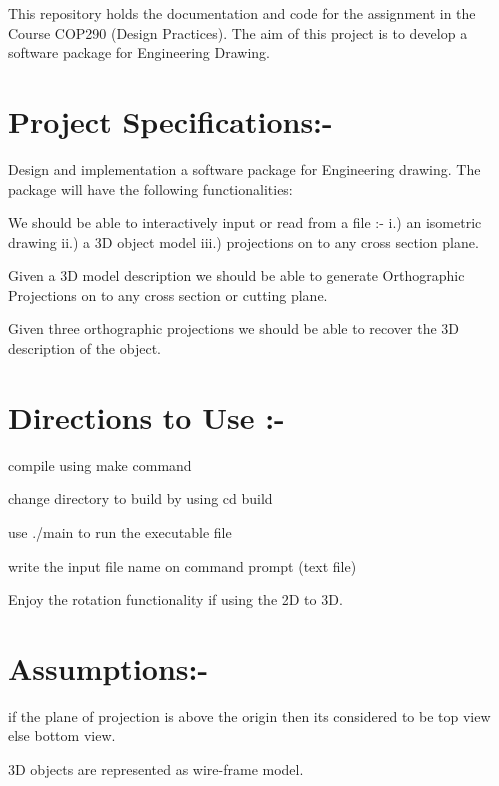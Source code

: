 This repository holds the documentation and code for the assignment in the Course C\+O\+P290 (Design Practices). The aim of this project is to develop a software package for Engineering Drawing.

\section*{Project Specifications\+:-\/}

Design and implementation a software package for Engineering drawing. The package will have the following functionalities\+:
\begin{DoxyEnumerate}
\item We should be able to interactively input or read from a file \+:-\/ i.) an isometric drawing ii.) a 3D object model iii.) projections on to any cross section plane.
\item Given a 3D model description we should be able to generate Orthographic Projections on to any cross section or cutting plane.
\item Given three orthographic projections we should be able to recover the 3D description of the object.
\end{DoxyEnumerate}

\section*{Directions to Use \+:-\/}


\begin{DoxyEnumerate}
\item compile using make command
\item change directory to build by using cd build
\item use ./main to run the executable file
\item write the input file name on command prompt (text file)
\item Enjoy the rotation functionality if using the 2D to 3D.
\end{DoxyEnumerate}

\section*{Assumptions\+:-\/}


\begin{DoxyEnumerate}
\item if the plane of projection is above the origin then its considered to be top view else bottom view.
\item 3D objects are represented as wire-\/frame model.
\end{DoxyEnumerate}

